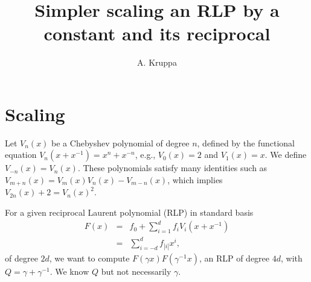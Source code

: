 \documentclass[a4paper]{article}
\begin{document}
\title{Simpler scaling an RLP by a constant and its reciprocal}
\author{A. Kruppa}
\maketitle
{}


\section{Scaling}

Let $V_n(x)$ be a Chebyshev polynomial of degree $n$, defined by the
functional equation $V_n(x+x^{-1}) = x^n + x^{-n}$, e.g., $V_0(x)=2$ and
$V_1(x)=x$. We define $V_{-n}(x) = V_n(x)$. 
These polynomials satisfy many identities such as 
$V_{m+n}(x) = V_m(x)V_n(x) - V_{m-n}(x)$, which implies 
$V_{2n}(x) + 2 = V_n(x)^2$.

For a given reciprocal Laurent polynomial (RLP) in standard basis
\begin{eqnarray*}
  F(x) & = & f_0 + \sum_{i=1}^{d} f_i V_i(x+x^{-1}) \\
  & = & \sum_{i=-d}^d f_{|i|} x^i,
\end{eqnarray*}
of degree $2d$, 
we want to compute 
$F(\gamma x)F(\gamma^{-1} x)$, 
an RLP of degree $4d$, with $Q = \gamma + \gamma^{-1}$.
We know $Q$ but not necessarily $\gamma$.
\end{document}
